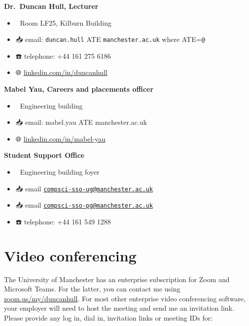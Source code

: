 \documentclass[
  12pt,
]{book}
\providecommand{\tightlist}{%
  \setlength{\itemsep}{0pt}\setlength{\parskip}{0pt}}
\begin{document}
\textbf{Dr.~Duncan Hull, Lecturer} 👨‍💻

\begin{itemize}
\tightlist
\item
  🏢 Room LF25, Kilburn Building
\item
  📥 email: \texttt{duncan.hull} ATE \texttt{manchester.ac.uk} where ATE=\texttt{@}
\item
  ☎️ telephone: +44 161 275 6186
\item
  🌐 \href{https://uk.linkedin.com/in/duncanhull}{linkedin.com/in/duncanhull}
\end{itemize}

\textbf{Mabel Yau, Careers and placements officer} 👩‍💻

\begin{itemize}
\tightlist
\item
  🏢 Engineering building
\item
  📥 email: mabel.yau ATE manchester.ac.uk
\item
  🌐 \href{https://uk.linkedin.com/in/mabel-yau}{linkedin.com/in/mabel-yau}
\end{itemize}

\textbf{Student Support Office } 👨‍👩‍👧‍👧

\begin{itemize}
\tightlist
\item
  🏢 Engineering building foyer
\item
  📥 email \href{mailto:compsci-sso-ug@manchester.ac.uk}{\nolinkurl{compsci-sso-ug@manchester.ac.uk}}
\item
  📥 email \href{mailto:compsci-sso-pg@manchester.ac.uk}{\nolinkurl{compsci-sso-pg@manchester.ac.uk}}
\item
  ☎️ telephone: +44 161 549 1288
\end{itemize}

\hypertarget{video-conferencing}{%
\section{Video conferencing}\label{video-conferencing}}

The University of Manchester has an enterprise subscription for Zoom and Microsoft Teams. For the latter, you can contact me using \href{https://zoom.us/my/duncanhull}{zoom.us/my/duncanhull}. For most other enterprise video conferencing software, your employer will need to host the meeting and send me an invitation link. Please provide any log in, dial in, invitation links or meeting IDs for:
\end{document}
